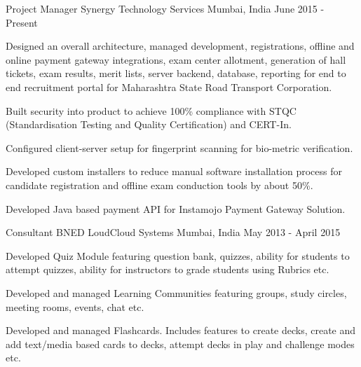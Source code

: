 

\begin{cventries}

  \cventry
    {Project Manager} %
    {Synergy Technology Services} %
    {Mumbai, India} %
    {June 2015 - Present} %
    {
      \begin{cvitems} %
        \item {Designed an overall architecture, managed development, registrations, offline and online payment gateway integrations, exam center allotment, generation of hall tickets, exam results, merit lists, server backend, database, reporting for end to end recruitment portal for Maharashtra State Road Transport Corporation.}
        \item {Built security into product to achieve 100\% compliance with STQC (Standardisation Testing and Quality Certification) and CERT-In.}
        \item {Configured client-server setup for fingerprint scanning for bio-metric verification.}
        \item {Developed custom installers to reduce manual software installation process for candidate registration and offline exam conduction tools by about 50\%.}
        \item {Developed Java based payment API for Instamojo Payment Gateway Solution.}
      \end{cvitems}
    }

  \cventry
  {Consultant} %
  {BNED LoudCloud Systems} %
  {Mumbai, India} %
  {May 2013 - April 2015} %
  {
  \begin{cvitems} %
    \item {Developed Quiz Module featuring question bank, quizzes, ability for students to attempt quizzes, ability for instructors to grade students using Rubrics etc.}
    \item {Developed and managed Learning Communities featuring groups, study circles, meeting rooms, events, chat etc.}
    \item {Developed and managed Flashcards. Includes features to create decks, create and add text/media based cards to decks, attempt decks in play and challenge modes etc.}
  \end{cvitems}
  }


\end{cventries}
